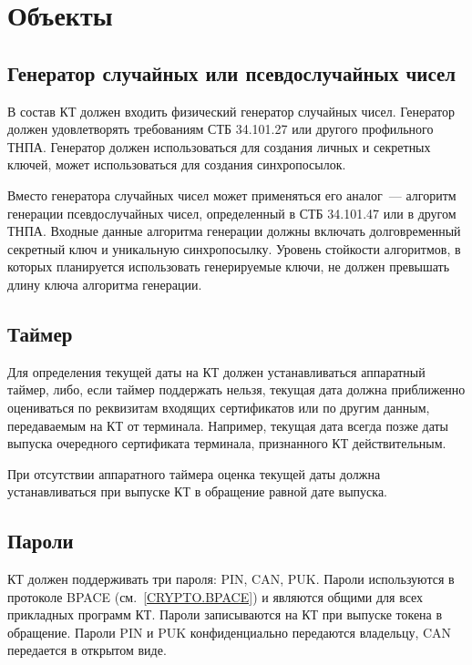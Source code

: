\chapter{Объекты}\label{OBJ}

\section{Генератор случайных или псевдослучайных чисел}\label{OBJ.RNG}

В состав КТ должен входить физический генератор случайных чисел.
Генератор должен удовлетворять требованиям СТБ 34.101.27 или другого 
профильного ТНПА. Генератор должен использоваться для создания личных и 
секретных ключей, может использоваться для создания синхропосылок. 

Вместо генератора случайных чисел может применяться его аналог~--- алгоритм 
генерации псевдослучайных чисел, определенный в СТБ 34.101.47 или в другом 
ТНПА. Входные данные алгоритма генерации должны включать долговременный 
секретный ключ и уникальную синхропосылку.
%
Уровень стойкости алгоритмов, в которых планируется использовать 
генерируемые ключи, не должен превышать длину ключа алгоритма генерации.

\section{Таймер}\label{OBJ.Date}

Для определения текущей даты на КТ должен устанавливаться аппаратный таймер, 
либо, если таймер поддержать нельзя, текущая дата должна 
приближенно оцениваться по реквизитам входящих сертификатов или по другим 
данным, передаваемым на КТ от терминала. Например, текущая дата всегда позже 
даты выпуска очередного сертификата терминала, признанного КТ действительным.

При отсутствии аппаратного таймера оценка текущей даты должна устанавливаться 
при выпуске КТ в обращение равной дате выпуска. 

\section{Пароли}\label{OBJ.PWD}

КТ должен поддерживать три пароля: PIN, CAN, PUK.
Пароли используются в протоколе BPACE (см.~\ref{CRYPTO.BPACE})
и являются общими для всех прикладных программ КТ.
%
Пароли записываются на КТ при выпуске токена в обращение. 
Пароли PIN и PUK конфиденциально передаются владельцу, 
CAN передается в открытом виде.

